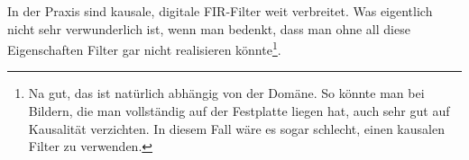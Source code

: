 \begin{example}
In der Praxis sind kausale, digitale FIR-Filter weit verbreitet. Was eigentlich nicht sehr 
verwunderlich ist, wenn man bedenkt, dass man ohne all diese Eigenschaften Filter gar nicht
realisieren könnte\footnote{Na gut, das ist natürlich abhängig von der Domäne. So könnte man bei 
Bildern, die man vollständig auf der Festplatte liegen hat, auch sehr gut auf Kausalität 
verzichten. In diesem Fall wäre es sogar schlecht, einen kausalen Filter zu verwenden.}. 
\end{example}